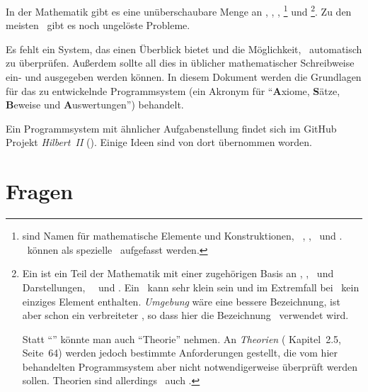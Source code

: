 In der Mathematik gibt es eine unüberschaubare Menge an \Axiomen, \Saetzen, \Beweisen, \emph{\Fachbegriffen}%
\footnote{%
	 sind Namen für mathematische Elemente und Konstruktionen, \textzB\ \Axiomen, \Saetze, \Beweise\ und \Fachgebiete.
	\Symbole\ können als spezielle \Fachbegriffe\ aufgefasst werden.
}
und \emph{\Fachgebieten}%
\footnote{%
	Ein  ist ein Teil der Mathematik mit einer zugehörigen Basis an \Axiomen, \Saetzen, \Fachbegriffen\ und Darstellungen, \textzB\ \Logik\ und \Mengenlehre.
	Ein \Fachgebiet\ kann sehr klein sein und im Extremfall bei \ASBA\ kein einziges Element enthalten.
	\emph{Umgebung} wäre eine bessere Bezeichnung, ist aber schon ein verbreiteter \Fachbegriff, so dass hier die Bezeichnung \Fachgebiet\ verwendet wird.

	Statt "`\Fachgebiet"' könnte man auch "`Theorie"' nehmen.
	An \emph{Theorien} ( Kapitel~2.5, Seite~64) werden jedoch bestimmte Anforderungen gestellt, die vom hier behandelten Programmsystem aber nicht notwendigerweise überprüft werden sollen.
	Theorien sind allerdings \textiAlg\ auch \Fachgebiete.
}.
Zu den meisten \Fachgebieten\ gibt es noch ungelöste Probleme.

Es fehlt ein System, das einen Überblick bietet und die Möglichkeit, \Beweise\ automatisch zu überprüfen.
Außerdem sollte all dies in üblicher mathematischer Schreibweise ein- und ausgegeben werden können.
In diesem Dokument werden die Grundlagen für das zu entwickelnde Programmsystem  (ein Akronym für "`\textbf{A}xiome, \textbf{S}ätze, \textbf{B}eweise und \textbf{A}uswertungen"') behandelt.

Ein Programmsystem mit ähnlicher Aufgabenstellung findet sich im GitHub Projekt \emph{Hilbert~II} (\cite{bib:HilbertII, bib:qedeq}).
Einige Ideen sind von dort übernommen worden.

\section     {Fragen}%
\label   {sec-Fragen}

